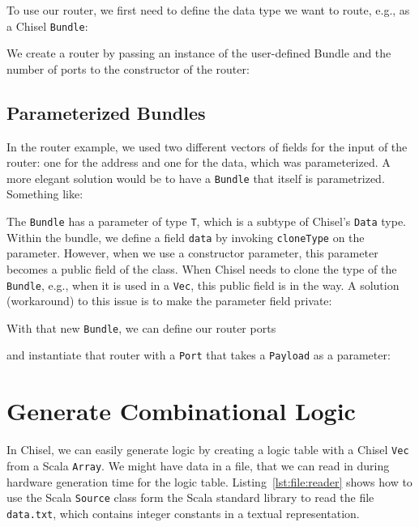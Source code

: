 \documentclass[%
    10pt,
    headinclude, footexclude,
    openright, %
    notitlepage,
    cleardoubleempty,
    headsepline,
    pointlessnumbers,
    bibtotoc, idxtotoc,
    ]{scrbook}
\newcommand{\code}[1]{{\small{\texttt{#1}}}}
\begin{document}

\noindent To use our router, we first need to define the data type we want to route, e.g.,
as a Chisel \code{Bundle}:


\noindent We create a router by passing an instance of the user-defined Bundle and
the number of ports to the constructor of the router:


\subsection{Parameterized Bundles}

In the router example, we used two different vectors of fields for the input
of the router: one for the address and one for the data, which was parameterized.
A more elegant solution would be to have a \code{Bundle} that itself
is parametrized. Something like:


The \code{Bundle} has a parameter of type \code{T}, which is a subtype
of Chisel's \code{Data} type.
Within the bundle, we define a field \code{data} by invoking \code{cloneType}
on the parameter.
However, when we use a constructor parameter, this parameter becomes a
public field of the class. When Chisel needs to clone the type of the \code{Bundle},
e.g., when it is used in a \code{Vec}, this public field is in the way.
A solution (workaround) to this issue is to make the parameter field private:


\noindent With that new \code{Bundle}, we can define our router ports


\noindent and instantiate that router with a \code{Port} that takes
a \code{Payload} as a parameter:



\section{Generate Combinational Logic}
\label{sec:gen:comb:logic}

In Chisel, we can easily generate logic by creating a logic table with
a Chisel \code{Vec} from a Scala \code{Array}.
We might have data in a file, that we can read in during hardware generation
time for the logic table.
Listing~\ref{lst:file:reader} shows how to use the Scala \code{Source}
class form the Scala standard library to read the file \code{data.txt}, which
contains integer constants in a textual representation.
\end{document}
